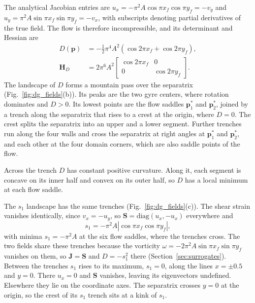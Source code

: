 \documentclass[lettersize,journal]{IEEEtran}
\begin{document}
The analytical Jacobian entries are
$u_x = -\pi^2 A \cos\pi x_f \cos\pi y_f = -v_y$ and
$u_y = \pi^2 A \sin\pi x_f \sin\pi y_f = -v_x$, with subscripts denoting
partial derivatives of the true field. The flow is therefore
incompressible, and its determinant and Hessian are
\begin{equation}
\begin{aligned}
D(\mathbf{p}) &= -\tfrac{1}{2}\pi^4 A^2 \left(\cos 2\pi x_f + \cos 2\pi y_f\right),\\
\mathbf{H}_D &= 2\pi^6 A^2
\begin{bmatrix} \cos 2\pi x_f & 0 \\ 0 & \cos 2\pi y_f \end{bmatrix}.
\end{aligned}
\label{eq:det_analytic_main}
\end{equation}
The landscape of $D$ forms a mountain pass over the separatrix
(Fig.~\ref{fig:dg_fields}(b)). Its peaks are the two gyre centers, where
rotation dominates and $D > 0$. Its lowest points are the flow saddles
$\mathbf{p}_1^*$ and $\mathbf{p}_2^*$, joined by a trench along the
separatrix that rises to a crest at the origin, where $D = 0$. The crest
splits the separatrix into an upper and a lower segment. Further trenches
run along the four walls and cross the separatrix at right angles at
$\mathbf{p}_1^*$ and $\mathbf{p}_2^*$, and each other at the four domain
corners, which are also saddle points of the flow.

Across the trench $D$ has constant positive curvature. Along it, each
segment is concave on its inner half and convex on its outer half, so $D$
has a local minimum at each flow saddle.

The $s_1$ landscape has the same trenches (Fig.~\ref{fig:dg_fields}(c)).
The shear strain vanishes identically, since $v_x = -u_y$, so
$\mathbf{S} = \mathrm{diag}(u_x, -u_x)$ everywhere and
\begin{equation}
s_1 = -\pi^2 A \left|\cos\pi x_f \cos\pi y_f\right|,
\label{eq:s1_analytic_main}
\end{equation}
with minima $s_1 = -\pi^2 A$ at the six flow saddles, where the trenches
cross. The two fields share these trenches because the vorticity
$\omega = -2\pi^2 A \sin\pi x_f \sin\pi y_f$ vanishes on them, so
$\mathbf{J} = \mathbf{S}$ and $D = -s_1^2$ there
(Section~\ref{sec:surrogates}). Between the trenches $s_1$ rises to its
maximum, $s_1 = 0$, along the lines $x = \pm 0.5$ and $y = 0$. There
$u_x = 0$ and $\mathbf{S}$ vanishes, leaving its eigenvectors undefined.
Elsewhere they lie on the coordinate axes. The separatrix crosses $y = 0$
at the origin, so the crest of its $s_1$ trench sits at a kink of $s_1$.
\end{document}
